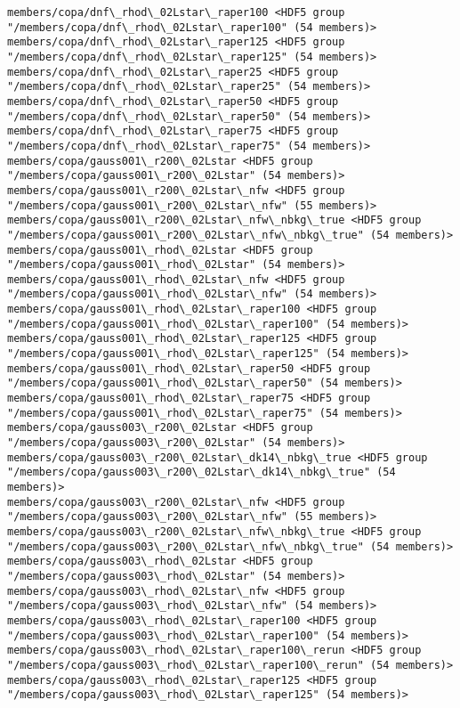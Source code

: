 \documentclass[11pt]{article}
\begin{document}
\begin{Verbatim}[commandchars=\\\{\}]
members/copa/dnf\_rhod\_02Lstar\_raper100 <HDF5 group "/members/copa/dnf\_rhod\_02Lstar\_raper100" (54 members)>
members/copa/dnf\_rhod\_02Lstar\_raper125 <HDF5 group "/members/copa/dnf\_rhod\_02Lstar\_raper125" (54 members)>
members/copa/dnf\_rhod\_02Lstar\_raper25 <HDF5 group "/members/copa/dnf\_rhod\_02Lstar\_raper25" (54 members)>
members/copa/dnf\_rhod\_02Lstar\_raper50 <HDF5 group "/members/copa/dnf\_rhod\_02Lstar\_raper50" (54 members)>
members/copa/dnf\_rhod\_02Lstar\_raper75 <HDF5 group "/members/copa/dnf\_rhod\_02Lstar\_raper75" (54 members)>
members/copa/gauss001\_r200\_02Lstar <HDF5 group "/members/copa/gauss001\_r200\_02Lstar" (54 members)>
members/copa/gauss001\_r200\_02Lstar\_nfw <HDF5 group "/members/copa/gauss001\_r200\_02Lstar\_nfw" (55 members)>
members/copa/gauss001\_r200\_02Lstar\_nfw\_nbkg\_true <HDF5 group "/members/copa/gauss001\_r200\_02Lstar\_nfw\_nbkg\_true" (54 members)>
members/copa/gauss001\_rhod\_02Lstar <HDF5 group "/members/copa/gauss001\_rhod\_02Lstar" (54 members)>
members/copa/gauss001\_rhod\_02Lstar\_nfw <HDF5 group "/members/copa/gauss001\_rhod\_02Lstar\_nfw" (54 members)>
members/copa/gauss001\_rhod\_02Lstar\_raper100 <HDF5 group "/members/copa/gauss001\_rhod\_02Lstar\_raper100" (54 members)>
members/copa/gauss001\_rhod\_02Lstar\_raper125 <HDF5 group "/members/copa/gauss001\_rhod\_02Lstar\_raper125" (54 members)>
members/copa/gauss001\_rhod\_02Lstar\_raper50 <HDF5 group "/members/copa/gauss001\_rhod\_02Lstar\_raper50" (54 members)>
members/copa/gauss001\_rhod\_02Lstar\_raper75 <HDF5 group "/members/copa/gauss001\_rhod\_02Lstar\_raper75" (54 members)>
members/copa/gauss003\_r200\_02Lstar <HDF5 group "/members/copa/gauss003\_r200\_02Lstar" (54 members)>
members/copa/gauss003\_r200\_02Lstar\_dk14\_nbkg\_true <HDF5 group "/members/copa/gauss003\_r200\_02Lstar\_dk14\_nbkg\_true" (54 members)>
members/copa/gauss003\_r200\_02Lstar\_nfw <HDF5 group "/members/copa/gauss003\_r200\_02Lstar\_nfw" (55 members)>
members/copa/gauss003\_r200\_02Lstar\_nfw\_nbkg\_true <HDF5 group "/members/copa/gauss003\_r200\_02Lstar\_nfw\_nbkg\_true" (54 members)>
members/copa/gauss003\_rhod\_02Lstar <HDF5 group "/members/copa/gauss003\_rhod\_02Lstar" (54 members)>
members/copa/gauss003\_rhod\_02Lstar\_nfw <HDF5 group "/members/copa/gauss003\_rhod\_02Lstar\_nfw" (54 members)>
members/copa/gauss003\_rhod\_02Lstar\_raper100 <HDF5 group "/members/copa/gauss003\_rhod\_02Lstar\_raper100" (54 members)>
members/copa/gauss003\_rhod\_02Lstar\_raper100\_rerun <HDF5 group "/members/copa/gauss003\_rhod\_02Lstar\_raper100\_rerun" (54 members)>
members/copa/gauss003\_rhod\_02Lstar\_raper125 <HDF5 group "/members/copa/gauss003\_rhod\_02Lstar\_raper125" (54 members)>

\end{Verbatim}
\end{document}
